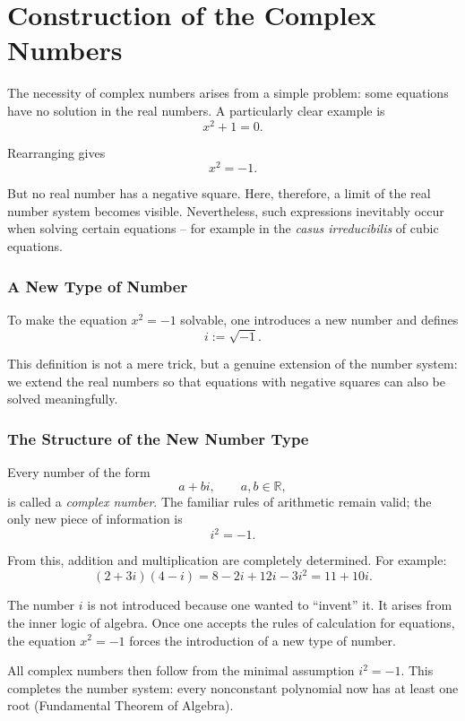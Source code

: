 \section{Construction of the Complex Numbers}
\label{anhangA_komplexe}

The necessity of complex numbers arises from a simple
problem: some equations have no solution in the real numbers.
A particularly clear example is
\[
x^2 + 1 = 0.
\]

Rearranging gives
\[
x^2 = -1.
\]

But no real number has a negative square.
Here, therefore, a limit of the real number system becomes visible.
Nevertheless, such expressions inevitably occur
when solving certain equations -- for example in the \emph{casus irreducibilis}
of cubic equations.

\subsubsection*{A New Type of Number}

To make the equation $x^2 = -1$ solvable, one introduces a new number
and defines
\[
i := \sqrt{-1}.
\]

This definition is not a mere trick, but a genuine extension
of the number system: we extend the real numbers so that equations
with negative squares can also be solved meaningfully.

\subsubsection*{The Structure of the New Number Type}

Every number of the form
\[
a + bi, \qquad a,b \in \mathbb{R},
\]
is called a \emph{complex number}. The familiar rules of arithmetic remain valid;
the only new piece of information is
\[
i^2 = -1.
\]

From this, addition and multiplication are completely determined.
For example:
\[
(2 + 3i)(4 - i)
= 8 - 2i + 12i - 3i^2
= 11 + 10i.
\]

\begin{DidacticBox}
	\label{box:i-necessary}
	The number $i$ is not introduced because one wanted to ``invent'' it.
	It arises from the inner logic of algebra.
	Once one accepts the rules of calculation for equations,
	the equation
	$x^2 = -1$
	forces the introduction of a new type of number.
	
	All complex numbers then follow from the minimal assumption
	$i^2 = -1$.
	This completes the number system:
	every nonconstant polynomial now has at least one root
	(Fundamental Theorem of Algebra).
\end{DidacticBox}

